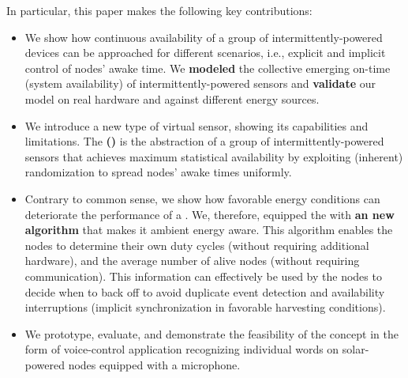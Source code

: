 In particular, this paper makes the following key contributions:
\begin{itemize}[noitemsep,topsep=10pt]
%
\item We show how continuous availability of a group of intermittently-powered devices can be approached for different scenarios, i.e., explicit and implicit control of nodes' awake time. 
We \textbf{modeled} the collective emerging on-time (system availability) of intermittently-powered sensors and \textbf{validate} our model on real hardware and against different energy sources. 
%
\item We introduce a new type of virtual sensor, showing its capabilities and limitations. The \textbf{\fullsys (\sys)} is the abstraction of a group of intermittently-powered sensors that achieves maximum statistical availability by exploiting (inherent) randomization to spread nodes' awake times uniformly.
% 
\item Contrary to common sense, we show how favorable energy conditions can deteriorate the performance of a \sys. We, therefore, equipped the \sys with \textbf{an new algorithm} that makes it ambient energy aware.
This algorithm enables the nodes to determine their own duty cycles (without requiring additional hardware),
and the average number of alive nodes (without requiring communication). This information can effectively be used by the nodes to decide when to back off to avoid duplicate event detection and availability interruptions (implicit synchronization in favorable harvesting conditions).

%
\item We prototype, evaluate, and demonstrate the feasibility of the \fullsys concept in the form of voice-control application recognizing individual words on solar-powered nodes equipped with a microphone.
\end{itemize}



